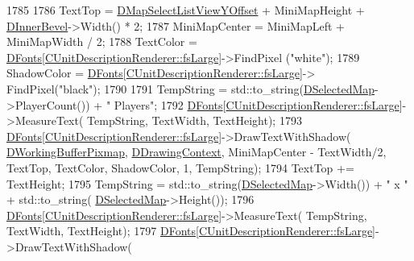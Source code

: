 \begin{DoxyCode}
1785     
1786     TextTop = \hyperlink{classCApplicationData_ae1a8eb3fff3cf5bc236564925bec1c8c}{DMapSelectListViewYOffset} + MiniMapHeight + 
      \hyperlink{classCApplicationData_a29a687c44dceb9e87a56d96612d59ab5}{DInnerBevel}->Width() * 2;
1787     MiniMapCenter = MiniMapLeft + MiniMapWidth / 2;
1788     TextColor = \hyperlink{classCApplicationData_afde9247d0a3ea87393ec86dcdb1e8274}{DFonts}[\hyperlink{classCUnitDescriptionRenderer_a3ea4cd83b6dd9533ab3abb953a7da35aaf467097fe4f4811a5e2f1959c86e071d}{CUnitDescriptionRenderer::fsLarge}]->FindPixel
      (\textcolor{stringliteral}{"white"});
1789     ShadowColor = \hyperlink{classCApplicationData_afde9247d0a3ea87393ec86dcdb1e8274}{DFonts}[\hyperlink{classCUnitDescriptionRenderer_a3ea4cd83b6dd9533ab3abb953a7da35aaf467097fe4f4811a5e2f1959c86e071d}{CUnitDescriptionRenderer::fsLarge}]->
      FindPixel(\textcolor{stringliteral}{"black"});
1790     
1791     TempString = std::to\_string(\hyperlink{classCApplicationData_abf74a18394e479b7090a8f9a55608867}{DSelectedMap}->PlayerCount()) + \textcolor{stringliteral}{" Players"};
1792     \hyperlink{classCApplicationData_afde9247d0a3ea87393ec86dcdb1e8274}{DFonts}[\hyperlink{classCUnitDescriptionRenderer_a3ea4cd83b6dd9533ab3abb953a7da35aaf467097fe4f4811a5e2f1959c86e071d}{CUnitDescriptionRenderer::fsLarge}]->MeasureText(
      TempString, TextWidth, TextHeight);
1793     \hyperlink{classCApplicationData_afde9247d0a3ea87393ec86dcdb1e8274}{DFonts}[\hyperlink{classCUnitDescriptionRenderer_a3ea4cd83b6dd9533ab3abb953a7da35aaf467097fe4f4811a5e2f1959c86e071d}{CUnitDescriptionRenderer::fsLarge}]->DrawTextWithShadow(
      \hyperlink{classCApplicationData_afa34cf2780f38dd28c0c811e69d60a97}{DWorkingBufferPixmap}, \hyperlink{classCApplicationData_aa6c5bea9bdcc64398e5a3f693661d37c}{DDrawingContext}, MiniMapCenter - TextWidth/2, 
      TextTop, TextColor, ShadowColor, 1, TempString);
1794     TextTop += TextHeight;
1795     TempString = std::to\_string(\hyperlink{classCApplicationData_abf74a18394e479b7090a8f9a55608867}{DSelectedMap}->Width()) + \textcolor{stringliteral}{" x "} + std::to\_string(
      \hyperlink{classCApplicationData_abf74a18394e479b7090a8f9a55608867}{DSelectedMap}->Height());
1796     \hyperlink{classCApplicationData_afde9247d0a3ea87393ec86dcdb1e8274}{DFonts}[\hyperlink{classCUnitDescriptionRenderer_a3ea4cd83b6dd9533ab3abb953a7da35aaf467097fe4f4811a5e2f1959c86e071d}{CUnitDescriptionRenderer::fsLarge}]->MeasureText(
      TempString, TextWidth, TextHeight);
1797     \hyperlink{classCApplicationData_afde9247d0a3ea87393ec86dcdb1e8274}{DFonts}[\hyperlink{classCUnitDescriptionRenderer_a3ea4cd83b6dd9533ab3abb953a7da35aaf467097fe4f4811a5e2f1959c86e071d}{CUnitDescriptionRenderer::fsLarge}]->DrawTextWithShadow(

\end{DoxyCode}
